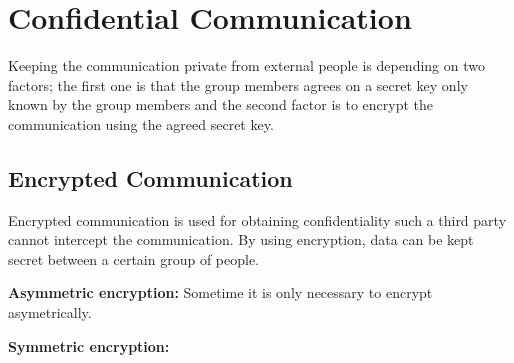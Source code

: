 \section{Confidential Communication}
Keeping the communication private from external people is depending on two factors; the first one is that the group members agrees on a secret key only known by the group members and the second factor is to encrypt the communication using the agreed secret key.
 
\subsection{Encrypted Communication}
Encrypted communication is used for obtaining confidentiality such a third party cannot intercept the communication. By using encryption, data can be kept secret between a certain group of people.

\textbf{Asymmetric encryption:} Sometime it is only necessary to encrypt asymetrically.

\textbf{Symmetric encryption:} 






